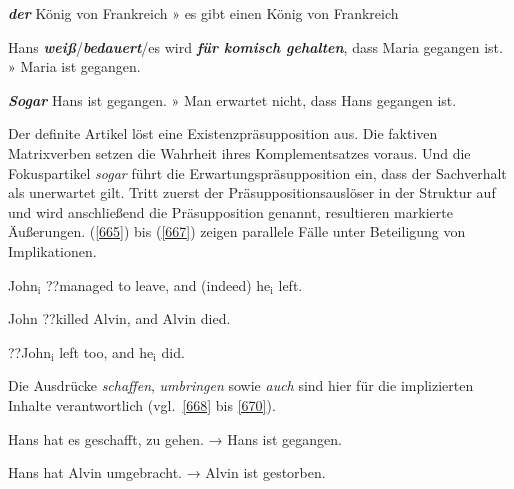 \begin{exe}
	\ex\label{662} 
	\textbf{\textit{der}} König von Frankreich » es gibt einen König von Frankreich
\end{exe}

\begin{exe}
	\ex\label{663} 
	Hans \textbf{\textit{weiß}}/\textbf{\textit{bedauert}}/es wird \textbf{\textit{für komisch gehalten}}, dass Maria gegangen ist. » Maria ist gegangen.
\end{exe}

\begin{exe}
	\ex\label{664} 
	\textbf{\textit{Sogar}} Hans ist gegangen. » Man erwartet nicht, dass Hans gegangen ist.
\end{exe}
Der definite Artikel löst eine Existenzpräsupposition  aus. Die faktiven Matrixverben  setzen die Wahrheit ihres Komplementsatzes voraus. Und die Fokuspartikel  \textit{sogar} führt die Erwartungspräsupposition  ein, dass der Sachverhalt als unerwartet gilt. Tritt zuerst der Präsuppositionsauslöser in der Struktur auf und wird anschließend die Präsupposition genannt, resultieren markierte Äußerungen. (\ref{665}) bis (\ref{667}) zeigen parallele Fälle unter Beteiligung von Implikationen.

\begin{exe}
	\ex\label{665} 
	John$_{\textrm{i}}$ ??managed to leave, and (indeed) he$_{\textrm{i}}$ left.
\end{exe}

\begin{exe}
	\ex\label{666} 
	John ??killed Alvin, and Alvin died.
\end{exe}

\begin{exe}
	\ex\label{667} 
	??John$_{\textrm{i}}$ left too, and he$_{\textrm{i}}$ did.
	\hfill\hbox{\citet[64/64/66]{Horn1976}}
\end{exe}						
Die Ausdrücke \textit{schaffen}, \textit{umbringen} sowie \textit{auch} sind hier für die implizierten Inhalte verantwortlich (vgl.\ \ref{668} bis \ref{670}).

\begin{exe}
	\ex\label{668} 
	Hans hat es geschafft, zu gehen. → Hans ist gegangen.
\end{exe}

\begin{exe}
	\ex\label{669} 
	Hans hat Alvin umgebracht. → Alvin ist gestorben.
\end{exe}

